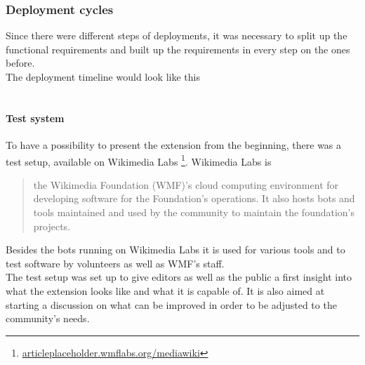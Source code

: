   \subsubsection{Deployment cycles}
  Since there were different steps of deployments, it was necessary to split up the functional requirements and built up the requirements in every step on the ones before. \\
  The deployment timeline would look like this
  \\ 
  \\


  \paragraph{Test system}
  To have a possibility to present the extension from the beginning, there was a test setup, available on Wikimedia Labs \footnote{\href{articleplaceholder.wmflabs.org/mediawiki}{articleplaceholder.wmflabs.org/mediawiki}}. Wikimedia Labs is 
	\begin{quotation}
		the Wikimedia Foundation (WMF)'s cloud computing environment for developing software for the Foundation's operations. It also hosts bots and tools maintained and used by the community to maintain the foundation's projects. 
	\end{quotation} 
Besides the bots running on Wikimedia Labs it is used for various tools and to test software by volunteers as well as WMF's staff. \\
The test setup was set up to give editors as well as the public a first insight into what the extension looks like and what it is capable of. It is also aimed at starting a discussion on what can be improved in order to be adjusted to the community's needs.

